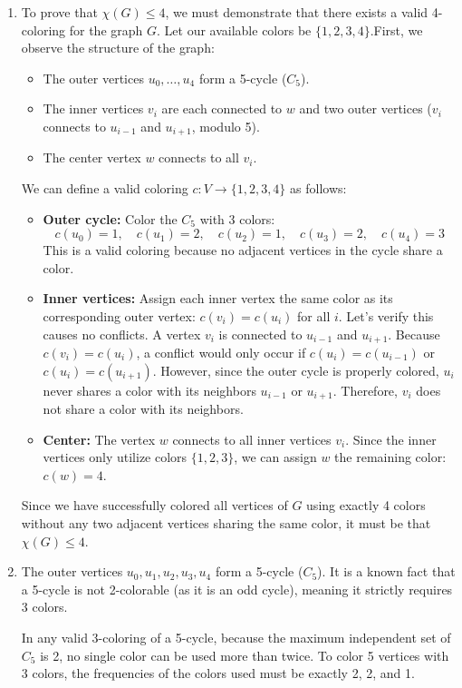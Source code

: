 \documentclass[11pt]{article}
\begin{document}
\begin{enumerate}[label=\textbf{(\alph*)}]
\item To prove that $\chi(G) \le 4$, we must demonstrate that there exists a valid 4-coloring for the graph $G$. Let our available colors be $\{1, 2, 3, 4\}$.First, we observe the structure of the graph:
\begin{itemize}
    \item The outer vertices $u_0, \dots, u_4$ form a 5-cycle ($C_5$).
    \item The inner vertices $v_i$ are each connected to $w$ and two outer vertices ($v_i$ connects to $u_{i-1}$ and $u_{i+1}$, modulo 5).
    \item The center vertex $w$ connects to all $v_i$.
\end{itemize}

We can define a valid coloring $c: V \to \{1,2,3,4\}$ as follows:
\begin{itemize}
    \item \textbf{Outer cycle:} Color the $C_5$ with 3 colors: 
    $$c(u_0)=1, \quad c(u_1)=2, \quad c(u_2)=1, \quad c(u_3)=2, \quad c(u_4)=3$$
    This is a valid coloring because no adjacent vertices in the cycle share a color.
    \item \textbf{Inner vertices:} Assign each inner vertex the same color as its corresponding outer vertex: $c(v_i) = c(u_i)$ for all $i$. 
    Let's verify this causes no conflicts. A vertex $v_i$ is connected to $u_{i-1}$ and $u_{i+1}$. Because $c(v_i) = c(u_i)$, a conflict would only occur if $c(u_i) = c(u_{i-1})$ or $c(u_i) = c(u_{i+1})$. However, since the outer cycle is properly colored, $u_i$ never shares a color with its neighbors $u_{i-1}$ or $u_{i+1}$. Therefore, $v_i$ does not share a color with its neighbors. 
    \item \textbf{Center:} The vertex $w$ connects to all inner vertices $v_i$. Since the inner vertices only utilize colors $\{1, 2, 3\}$, we can assign $w$ the remaining color: $c(w) = 4$.
\end{itemize}
Since we have successfully colored all vertices of $G$ using exactly 4 colors without any two adjacent vertices sharing the same color, it must be that $\chi(G) \le 4$.

\item The outer vertices $u_0, u_1, u_2, u_3, u_4$ form a 5-cycle ($C_5$). It is a known fact that a 5-cycle is not 2-colorable (as it is an odd cycle), meaning it strictly requires 3 colors. 

In any valid 3-coloring of a 5-cycle, because the maximum independent set of $C_5$ is 2, no single color can be used more than twice. To color 5 vertices with 3 colors, the frequencies of the colors used must be exactly 2, 2, and 1. 


\end{enumerate}
\end{document}
